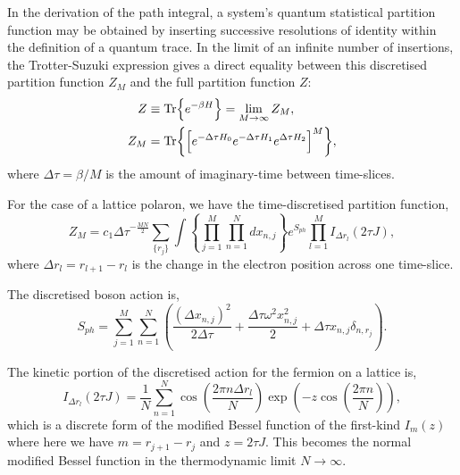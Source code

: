 In the derivation of the path integral, a system's quantum statistical partition function may be obtained by inserting successive resolutions of identity within the definition of a quantum trace. In the limit of an infinite number of insertions, the Trotter-Suzuki expression \cite{trotter_product_1959, hatano_finding_2005} gives a direct equality between this discretised partition function $Z_M$ and the full partition function $Z$:
\begin{equation}
    \begin{aligned}
        Z &\equiv \Tr{e^{-\beta H}} = \lim_{M\to\infty} Z_M , \\
        Z_M &= \Tr{\left[ e^{-\Delta\tau H_0} e^{-\Delta\tau H_1} e^{\Delta\tau H_2} \right]^M} ,
    \end{aligned}
\end{equation}
where $\Delta\tau = \beta / M$ is the amount of imaginary-time between time-slices.

For the case of a lattice polaron, we have the time-discretised partition function,
\begin{equation}
    Z_M = c_1 {\Delta\tau}^{-\frac{MN}{2}} \sum_{\{r_j\}} \int \left\{ \prod_{j=1}^M \prod_{n=1}^N dx_{n,j} \right\} e^{S_{ph}} \prod_{l=1}^M I_{\Delta r_l}(2 \tau J) ,
\end{equation}
where $\Delta r_l = r_{l+1} - r_l$ is the change in the electron position across one time-slice.

The discretised boson action is,
\begin{equation}
    S_{ph} = \sum_{j=1}^M \sum_{n=1}^N \left( \frac{\left( \Delta x_{n,j} \right)^2}{2 \Delta\tau} + \frac{\Delta\tau \omega^2 x^2_{n,j}}{2} + \Delta\tau x_{n,j} \delta_{n,r_j}\right) .
\end{equation}

The kinetic portion of the discretised action for the fermion on a lattice is,
\begin{equation}
    I_{\Delta r_l}(2 \tau J) = \frac{1}{N} \sum_{n=1}^N \cos\left( \frac{2\pi n \Delta r_l}{N}  \right) \exp\left(-z \cos\left(\frac{2\pi n}{N}\right)\right) ,
\end{equation}
which is a discrete form of the modified Bessel function of the first-kind $I_m(z)$ \cite[\href{http://dlmf.nist.gov/10.32.E3}{(10.32.3)}]{NIST:DLMF} where here we have $m = r_{j+1} - r_j$ and $z = 2 \tau J$. This becomes the normal modified Bessel function in the thermodynamic limit $N \to \infty$.

